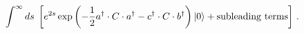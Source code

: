 \begin{equation}
\int^\infty ds \; \left[ e^{2s} \exp \left(
-\frac{1}{2}a^{\dagger} \cdot C \cdot a^{\dagger} -c^{\dagger}\cdot
C\cdot b^{\dagger} 
\right)| 0 \rangle + {\rm subleading\ terms} \right]\,.
\end{equation}

